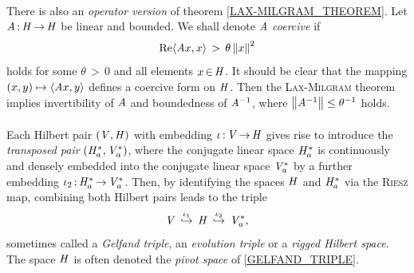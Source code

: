 \documentclass[11pt,twoside]{article}
\begin{document}

\paragraph{} %
There is also an \textit{operator version} of theorem \ref{LAX-MILGRAM_THEOREM}.
Let $\mathit{A} {\,:\,} \mathit{H} {\,\to\,} \mathit{H}$ be linear and bounded.
We shall denote $\mathit{A}$ \textit{coercive} if
\[
\operatorname{Re} \langle \mathit{A} x,x \rangle \, > \, \theta \left\lVert x \right\rVert^2
\]
holds for some $\theta {\,>\,} 0$ and all elements $x {\,\in\,} \mathit{H}$.
It should be clear
that the mapping $(x,y) \mapsto \langle \mathit{A} x,y \rangle$
defines a coercive form on $\mathit{H}$.
Then the \textsc{Lax-Milgram} theorem implies
invertibility of $\mathit{A}$ and boundedness of $\mathit{A}^{-1}$,
where $\left\lVert \mathit{A}^{-1} \right\rVert \leq \theta^{-1}$ holds.

\paragraph{} %
Each Hilbert pair $(\mathit{V},\mathit{H})$ with embedding $\iota {\,:\,} \mathit{V} {\,\to\,} \mathit{H}$
gives rise to introduce the \textit{transposed pair}
$(\mathit{H}_a^*,\mathit{V}_a^*)$,
where the conjugate linear space $\mathit{H}_a^*$
is continuously and densely embedded into
the conjugate linear space $\mathit{V}_a^*$
by a further embedding $\iota_2 {\,:\,} \mathit{H}_a^* {\,\to\,} \mathit{V}_a^*$.
Then,
by identifying the spaces $\mathit{H}$ and $\mathit{H}_a^*$
via the \textsc{Riesz} map,
combining both Hilbert pairs leads to the triple
\begin{equation}\label{GELFAND_TRIPLE}
\mathit{V} \, \overset{\iota_1}{\hookrightarrow} \,
\mathit{H} \, \overset{\iota_2}{\hookrightarrow} \, \mathit{V}_a^*,
\end{equation}
sometimes called a \textit{Gelfand triple},
an \textit{evolution triple} or a \textit{rigged Hilbert space}.
The space $\mathit{H}$ is often denoted the \textit{pivot space}
of \eqref{GELFAND_TRIPLE}.
\end{document}
